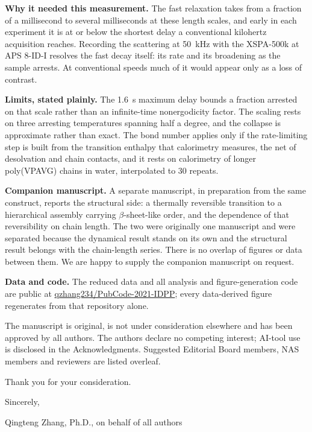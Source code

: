 \documentclass[10pt]{article}
\begin{document}
\textbf{Why it needed this measurement.} The fast relaxation takes from a
fraction of a millisecond to several milliseconds at these length scales, and
early in each experiment it is at or below the shortest delay a conventional
kilohertz acquisition reaches. Recording the scattering at 50~kHz with the
XSPA-500k at APS 8-ID-I resolves the fast decay itself: its rate and its
broadening as the sample arrests. At conventional speeds much of it would
appear only as a loss of contrast.

\textbf{Limits, stated plainly.} The 1.6~s maximum delay bounds a fraction
arrested on that scale rather than an infinite-time nonergodicity factor. The
scaling rests on three arresting temperatures spanning half a degree, and the
collapse is approximate rather than exact. The bond number applies only if
the rate-limiting step is built from the transition enthalpy that calorimetry
measures, the net of desolvation and chain contacts, and it rests on
calorimetry of longer poly(VPAVG) chains in water, interpolated to 30 repeats.

\textbf{Companion manuscript.} A separate manuscript, in preparation from the
same construct, reports the structural side: a thermally reversible transition
to a hierarchical assembly carrying $\beta$-sheet-like order, and the
dependence of that reversibility on chain length. The two were originally one
manuscript and were separated because the dynamical result stands on its own and
the structural result belongs with the chain-length series. There is no
overlap of figures or data between them. We are happy to supply the companion
manuscript on request.

\textbf{Data and code.} The reduced data and all analysis and figure-generation
code are public at
\href{https://github.com/qzhang234/PubCode-2021-IDPP}{qzhang234/PubCode-2021-IDPP};
every data-derived figure regenerates from that repository alone.

The manuscript is original, is not under consideration elsewhere and has been
approved by all authors. The authors declare no competing interest;
AI-tool use is disclosed in the Acknowledgments. Suggested Editorial Board
members, NAS members and reviewers are listed overleaf.

Thank you for your consideration.

Sincerely,

\vspace{0.1in}
\nopagebreak
Qingteng Zhang, Ph.D., on behalf of all authors

\newpage
\end{document}
